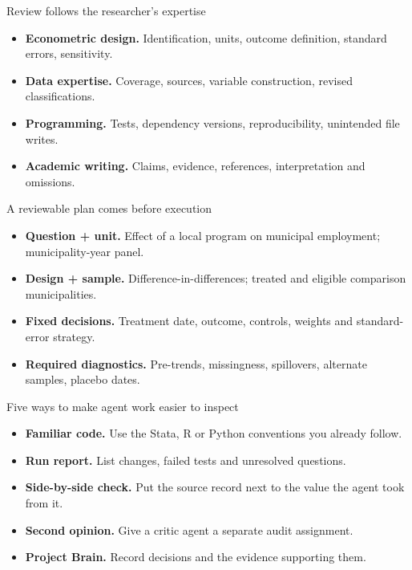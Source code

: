\begin{frame}{Review follows the researcher’s expertise}
\begin{itemize}\setlength{\itemsep}{0.42em}
\item \textbf{Econometric design.} Identification, units, outcome definition, standard errors, sensitivity.
\item \textbf{Data expertise.} Coverage, sources, variable construction, revised classifications.
\item \textbf{Programming.} Tests, dependency versions, reproducibility, unintended file writes.
\item \textbf{Academic writing.} Claims, evidence, references, interpretation and omissions.
\end{itemize}
\end{frame}

\begin{frame}{A reviewable plan comes before execution}
\begin{itemize}\setlength{\itemsep}{0.5em}
\item \textbf{Question + unit.} Effect of a local program on municipal employment; municipality-year panel.
\item \textbf{Design + sample.} Difference-in-differences; treated and eligible comparison municipalities.
\item \textbf{Fixed decisions.} Treatment date, outcome, controls, weights and standard-error strategy.
\item \textbf{Required diagnostics.} Pre-trends, missingness, spillovers, alternate samples, placebo dates.
\end{itemize}
\end{frame}

\begin{frame}{Five ways to make agent work easier to inspect}
\begin{itemize}\setlength{\itemsep}{0.42em}
\item \textbf{Familiar code.} Use the Stata, R or Python conventions you already follow.
\item \textbf{Run report.} List changes, failed tests and unresolved questions.
\item \textbf{Side-by-side check.} Put the source record next to the value the agent took from it.
\item \textbf{Second opinion.} Give a critic agent a separate audit assignment.
\item \textbf{Project Brain.} Record decisions and the evidence supporting them.
\end{itemize}
\end{frame}

